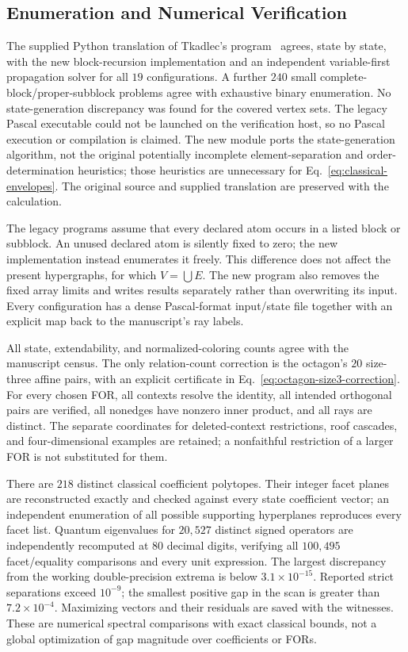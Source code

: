 \documentclass[aps,pra,reprint,superscriptaddress,longbibliography,nofootinbib,floatfix,10pt]{revtex4-2}
\theoremstyle{definition}\newtheorem{definition}[theorem]{Definition}
\theoremstyle{remark}\newtheorem{remark}[theorem]{Remark}
\begin{document}
\subsection{Enumeration and Numerical Verification}

The supplied Python translation of Tkadlec's program~\cite{tkadlec-2states-2017} agrees, state by state, with the new block-recursion implementation and an independent variable-first propagation solver for all $19$ configurations. A further $240$ small complete-block/proper-subblock problems agree with exhaustive binary enumeration. No state-generation discrepancy was found for the covered vertex sets. The legacy Pascal executable could not be launched on the verification host, so no Pascal execution or compilation is claimed. The new module ports the state-generation algorithm, not the original potentially incomplete element-separation and order-determination heuristics; those heuristics are unnecessary for Eq.~\eqref{eq:classical-envelopes}. The original source and supplied translation are preserved with the calculation.

The legacy programs assume that every declared atom occurs in a listed block or subblock. An unused declared atom is silently fixed to zero; the new implementation instead enumerates it freely. This difference does not affect the present hypergraphs, for which $V=\bigcup E$. The new program also removes the fixed array limits and writes results separately rather than overwriting its input. Every configuration has a dense Pascal-format input/state file together with an explicit map back to the manuscript's ray labels.

All state, extendability, and normalized-coloring counts agree with the manuscript census. The only relation-count correction is the octagon's $20$ size-three affine pairs, with an explicit certificate in Eq.~\eqref{eq:octagon-size3-correction}. For every chosen FOR, all contexts resolve the identity, all intended orthogonal pairs are verified, all nonedges have nonzero inner product, and all rays are distinct. The separate coordinates for deleted-context restrictions, roof cascades, and four-dimensional examples are retained; a nonfaithful restriction of a larger FOR is not substituted for them.

There are $218$ distinct classical coefficient polytopes. Their integer facet planes are reconstructed exactly and checked against every state coefficient vector; an independent enumeration of all possible supporting hyperplanes reproduces every facet list. Quantum eigenvalues for $20{,}527$ distinct signed operators are independently recomputed at $80$ decimal digits, verifying all $100{,}495$ facet/equality comparisons and every unit expression. The largest discrepancy from the working double-precision extrema is below $3.1\times10^{-15}$. Reported strict separations exceed $10^{-9}$; the smallest positive gap in the scan is greater than $7.2\times10^{-4}$. Maximizing vectors and their residuals are saved with the witnesses. These are numerical spectral comparisons with exact classical bounds, not a global optimization of gap magnitude over coefficients or FORs.
\end{document}
